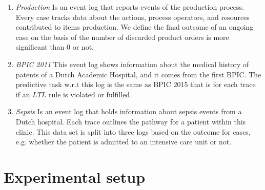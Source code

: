 \begin{enumerate}
	\item \textit{Production }
	Is an event log that reports events of the production process. Every case tracks data about the actions, process operators, and resources contributed to items production. We define the final outcome of an ongoing case on the basis of the number of discarded product orders is  more significant than $0$ or not.
	
	
	\item \textit{BPIC 2011 }
	This event log shows information about the medical history of patents of a Dutch Academic Hospital, and it comes from the first BPIC. The predictive task w.r.t this log is the same as BPIC 2015 that is for each trace if an $LTL$ rule \cite{pnueli1977temporal} is violated or fulfilled.
	
	
	\item \textit{Sepsis }
	Is an event log that holds information about sepsis events from a Dutch hospital. Each trace outlines the pathway for a patient within this clinic. This data set is split into three logs based on the outcome for cases, e.g. whether the patient is admitted to an intensive care unit or not.
	

\end{enumerate}

\section{Experimental setup}

